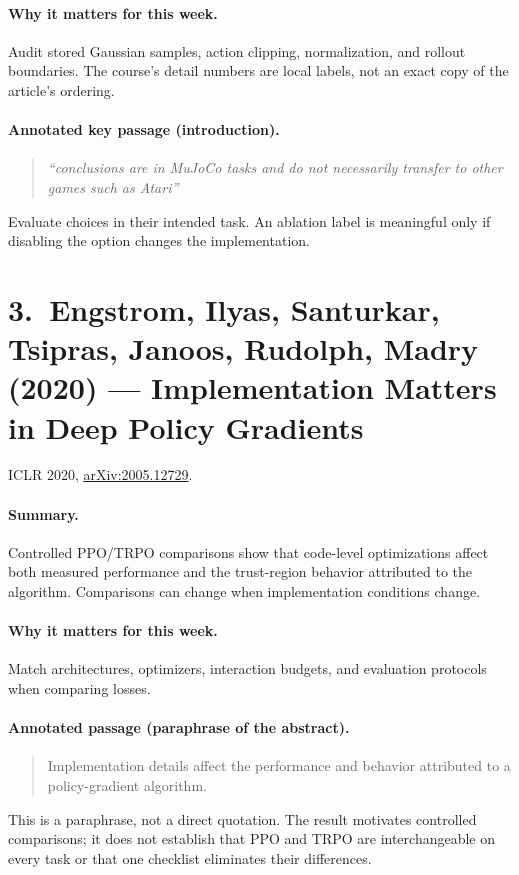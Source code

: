 \documentclass[11pt]{scrartcl}
\begin{document}
\paragraph{Why it matters for this week.} Audit stored Gaussian samples, action clipping, normalization, and rollout boundaries. The course's detail numbers are local labels, not an exact copy of the article's ordering.
\paragraph{Annotated key passage (introduction).}
\begin{quote}\emph{``conclusions are in MuJoCo tasks and do not necessarily transfer to other games such as Atari''}\end{quote}
Evaluate choices in their intended task. An ablation label is meaningful only if disabling the option changes the implementation.


\section*{3.\ Engstrom, Ilyas, Santurkar, Tsipras, Janoos, Rudolph, Madry (2020) --- Implementation Matters in Deep Policy Gradients}
ICLR 2020, \href{https://arxiv.org/abs/2005.12729}{arXiv:2005.12729}.

\paragraph{Summary.} Controlled PPO/TRPO comparisons show that code-level optimizations affect both measured performance and the trust-region behavior attributed to the algorithm. Comparisons can change when implementation conditions change.
\paragraph{Why it matters for this week.} Match architectures, optimizers, interaction budgets, and evaluation protocols when comparing losses.
\paragraph{Annotated passage (paraphrase of the abstract).}
\begin{quote}Implementation details affect the performance and behavior attributed to a policy-gradient algorithm.\end{quote}
This is a paraphrase, not a direct quotation. The result motivates controlled comparisons; it does not establish that PPO and TRPO are interchangeable on every task or that one checklist eliminates their differences.
\end{document}
